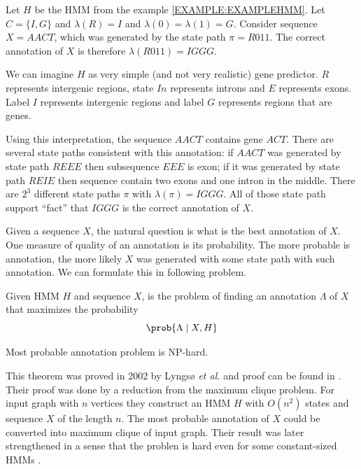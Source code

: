 \begin{example}\label{EXAMPLE:ANNOTATION}
Let $H$ be the HMM from the example \ref{EXAMPLE:EXAMPLEHMM}. Let $C=\{I,G\}$ and
$\lambda(R)=I$ and $\lambda(0)=\lambda(1)=G$.  Consider sequence
$X=AACT$, which was generated by the state path $\pi=R011$. The correct
annotation of $X$ is therefore  $\lambda(R011) =
IGGG$. 

 We can imagine $H$ as very simple (and not very realistic) gene
predictor. $R$ represents intergenic regions, state $In$
represents introns and $E$ represents exons. Label $I$ represents
intergenic regions and label $G$ represents regions that are genes.

Using this interpretation, the sequence $AACT$ contains gene $ACT$. There are
several state paths consistent with this annotation: if $AACT$ was generated by state path
$REEE$ then subsequence $EEE$ is exon; if it was generated by state path $REIE$
then sequence contain two exons and one intron in the middle. There are $2^3$
different state paths $\pi$ with $\lambda(\pi)=IGGG$.  All of those state path
support ``fact'' that $IGGG$ is the correct annotation of $X$.

\end{example}

Given a sequence $X$, the natural question is what is the best annotation of
$X$.  One measure of quality of an annotation is its probability. The more
probable is annotation, the more likely $X$ was generated with some state path with
such annotation. We can formulate this in following problem.

\begin{definition}
Given HMM $H$ and sequence $X$,  is the problem of finding an annotation $\Lambda$ of $X$ that maximizes
the probability \[\prob{\Lambda\mid X,H}\]
\end{definition}

\begin{theorem}
Most probable annotation problem is NP-hard.
\end{theorem}
This theorem was proved in 2002 by Lyngsø {\it et al.} and proof can be found in
\cite{Lyngso2002}. Their proof was done by a reduction from the maximum clique problem.
For input graph with $n$ vertices they construct an HMM $H$ with $O(n^2)$ states and
sequence $X$ of the length $n$. The most probable annotation of $X$ could be
converted into maximum clique of input graph. 
Their result was later strengthened in a sense that the problen is hard even for some constant-sized HMMs \cite{Brejova2007mpa}.

